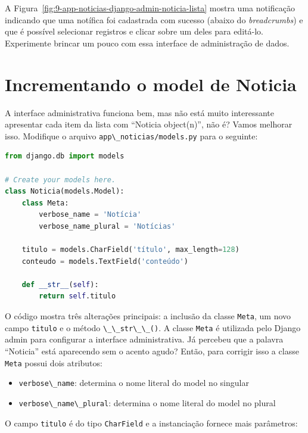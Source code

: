\documentclass[brazil,a4paper,oneside,openright,parskip=full]{book}
\newcommand{\passthrough}[1]{#1}
\providecommand{\tightlist}{%
  \setlength{\itemsep}{0pt}\setlength{\parskip}{0pt}}
\begin{document}
A Figura~\ref{fig:9-app-noticias-django-admin-noticia-lista} mostra uma
notificação indicando que uma notífica foi cadastrada com sucesso
(abaixo do \emph{breadcrumbs}) e que é possível selecionar registros e
clicar sobre um deles para editá-lo. Experimente brincar um pouco com
essa interface de administração de dados.

\hypertarget{incrementando-o-model-de-noticia}{%
\section{Incrementando o model de
Noticia}\label{incrementando-o-model-de-noticia}}

A interface administrativa funciona bem, mas não está muito interessante
apresentar cada item da lista com ``Noticia object(n)'', não é? Vamos
melhorar isso. Modifique o arquivo
\passthrough{\lstinline!app\_noticias/models.py!} para o seguinte:

\begin{lstlisting}[language=Python]
from django.db import models

# Create your models here.
class Noticia(models.Model):
    class Meta:
        verbose_name = 'Notícia'
        verbose_name_plural = 'Notícias'

    titulo = models.CharField('título', max_length=128)
    conteudo = models.TextField('conteúdo')

    def __str__(self):
        return self.titulo
\end{lstlisting}

O código mostra três alterações principais: a inclusão da classe
\passthrough{\lstinline!Meta!}, um novo campo
\passthrough{\lstinline!titulo!} e o método
\passthrough{\lstinline!\_\_str\_\_()!}. A classe
\passthrough{\lstinline!Meta!} é utilizada pelo Django admin para
configurar a interface administrativa. Já percebeu que a palavra
``Noticia'' está aparecendo sem o acento agudo? Então, para corrigir
isso a classe \passthrough{\lstinline!Meta!} possui dois atributos:

\begin{itemize}
\tightlist
\item
  \passthrough{\lstinline!verbose\_name!}: determina o nome literal do
  model no singular
\item
  \passthrough{\lstinline!verbose\_name\_plural!}: determina o nome
  literal do model no plural
\end{itemize}

O campo \passthrough{\lstinline!titulo!} é do tipo
\passthrough{\lstinline!CharField!} e a instanciação fornece mais
parâmetros:
\end{document}
